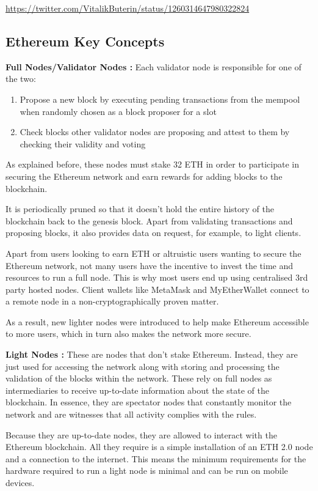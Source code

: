 \url{https://twitter.com/VitalikButerin/status/1260314647980322824}



\subsection{Ethereum Key Concepts}

\textbf{Full Nodes/Validator Nodes :}
Each validator node is responsible for one of the two:
\begin{enumerate}
    \item Propose a new block by executing pending transactions from the mempool when randomly chosen as a block proposer for a slot
    \item Check blocks other validator nodes are proposing and attest to them by checking their validity and voting 
\end{enumerate}
As explained before, these nodes must stake 32 ETH in order to participate in securing the Ethereum network and earn rewards for adding blocks to the blockchain.

It is periodically pruned so that it doesn't hold the entire history of the blockchain back to the genesis block. Apart from validating transactions and proposing blocks, it also provides data on request, for example, to light clients.

Apart from users looking to earn ETH or altruistic users wanting to secure the Ethereum network, not many users have the incentive to invest the time and resources to run a full node. This is why most users end up using centralised 3rd party hosted nodes. Client wallets like MetaMask and MyEtherWallet connect to a remote node in a non-cryptographically proven matter. 

As a result, new lighter nodes were introduced to help make Ethereum accessible to more users, which in turn also makes the network more secure.

\textbf{Light Nodes :}
These are nodes that don't stake Ethereum. Instead, they are just used for accessing the network along with storing and processing the validation of the blocks within the network. These rely on full nodes as intermediaries to receive up-to-date information about the state of the blockchain. In essence, they are spectator nodes that constantly monitor the network and are witnesses that all activity complies with the rules.

Because they are up-to-date nodes, they are allowed to interact with the Ethereum blockchain.  All they require is a simple installation of an ETH 2.0 node and a connection to the internet. This means the minimum requirements for the hardware required to run a light node is minimal and can be run on mobile devices.


